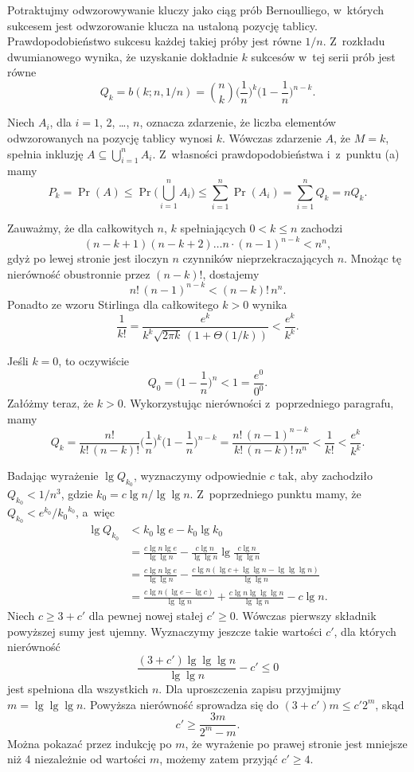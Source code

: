 
\subproblem %
Potraktujmy odwzorowywanie kluczy jako ciąg prób Bernoulliego, w~których sukcesem jest odwzorowanie klucza na ustaloną pozycję tablicy.
Prawdopodobieństwo sukcesu każdej takiej próby jest równe $1/n$.
Z~rozkładu dwumianowego wynika, że uzyskanie dokładnie $k$ sukcesów w~tej serii prób jest równe
\[
	Q_k = b(k;n,1/n) = \binom{n}{k}\biggl(\frac{1}{n}\biggr)^k\biggl(1-\frac{1}{n}\biggr)^{n-k}.
\]

\subproblem %
Niech $A_i$, dla $i=1$, 2, \dots, $n$, oznacza zdarzenie, że liczba elementów odwzorowanych na  pozycję tablicy wynosi $k$.
Wówczas zdarzenie $A$, że $M=k$, spełnia inkluzję $A\subseteq\bigcup_{i=1}^nA_i$.
Z~własności prawdopodobieństwa i~z~punktu (a) mamy
\[
	P_k = \Pr(A) \le \Pr\biggl(\bigcup_{i=1}^nA_i\biggr) \le \sum_{i=1}^n\Pr(A_i) = \sum_{i=1}^nQ_k = nQ_k.
\]

\subproblem %
Zauważmy, że dla całkowitych $n$, $k$ spełniających $0<k\le n$ zachodzi
\[
	(n-k+1)(n-k+2)\dots n\cdot(n-1)^{n-k} < n^n,
\]
gdyż po lewej stronie jest iloczyn $n$ czynników nieprzekraczających $n$.
Mnożąc tę nierówność obustronnie przez $(n-k)!$, dostajemy
\[
	n!\,(n-1)^{n-k} < (n-k)!\,n^n.
\]
Ponadto ze wzoru Stirlinga dla całkowitego $k>0$ wynika
\[
	\frac{1}{k!} = \frac{e^k}{k^k\sqrt{2\pi k}\,(1+\Theta(1/k))} < \frac{e^k}{k^k}.
\]

Jeśli $k=0$, to oczywiście
\[
	Q_0 = \biggl(1-\frac{1}{n}\biggr)^n < 1 = \frac{e^0}{0^0}.
\]
Załóżmy teraz, że $k>0$.
Wykorzystując nierówności z~poprzedniego paragrafu, mamy
\[
	Q_k = \frac{n!}{k!\,(n-k)!}\biggl(\frac{1}{n}\biggr)^k\biggl(1-\frac{1}{n}\biggr)^{n-k} = \frac{n!\,(n-1)^{n-k}}{k!\,(n-k)!\,n^n} < \frac{1}{k!} < \frac{e^k}{k^k}.
\]

\subproblem %

\noindent Badając wyrażenie $\lg Q_{k_0}$, wyznaczymy odpowiednie $c$ tak, aby zachodziło $Q_{k_0}<1/n^3$, gdzie $k_0=c\lg n/\!\lg\lg n$.
Z~poprzedniego punktu mamy, że $Q_{k_0}<e^{k_0}\!/{k_0}^{k_0}$, a~więc
\begin{align*}
	\lg Q_{k_0} &< k_0\lg e-k_0\lg k_0 \\
	&= \frac{c\lg n\lg e}{\lg\lg n}-\frac{c\lg n}{\lg\lg n}\lg\frac{c\lg n}{\lg\lg n} \\[1mm]
	&= \frac{c\lg n\lg e}{\lg\lg n}-\frac{c\lg n(\lg c+\lg\lg n-\lg\lg\lg n)}{\lg\lg n} \\[1mm]
	&= \frac{c\lg n(\lg e-\lg c)}{\lg\lg n}+\frac{c\lg n\lg\lg\lg n}{\lg\lg n}-c\lg n.
\end{align*}
Niech $c\ge3+c'$ dla pewnej nowej stałej $c'\ge0$.
Wówczas pierwszy składnik powyższej sumy jest ujemny.
Wyznaczymy jeszcze takie wartości $c'$, dla których nierówność
\[
	\frac{(3+c')\lg\lg\lg n}{\lg\lg n}-c' \le 0
\]
jest spełniona dla wszystkich $n$.
Dla uproszczenia zapisu przyjmijmy $m=\lg\lg\lg n$.
Powyższa nierówność sprowadza się do $(3+c')m\le c'2^m$, skąd
\[
	c' \ge \frac{3m}{2^m-m}.
\]
Można pokazać przez indukcję po $m$, że wyrażenie po prawej stronie jest mniejsze niż 4 niezależnie od wartości $m$, możemy zatem przyjąć $c'\ge4$.

